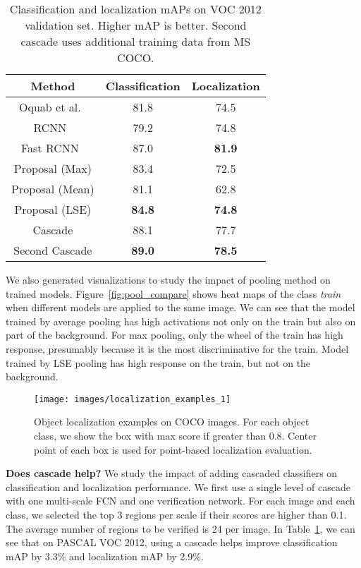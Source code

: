 \documentclass[10pt,twocolumn,letterpaper]{article}
\begin{document}
\begin{table}
\small
\center
\begin{tabular}{ccc}
\hline
Method & Classification & Localization\\
\hline
\rowcolor{gray!30}Oquab et al.~\cite{Oquab_2015_CVPR} & 81.8 & 74.5\\
RCNN~\cite{DBLP:journals/corr/GirshickDDM13} & 79.2 & 74.8\\
\rowcolor{gray!30}Fast RCNN~\cite{DBLP:journals/corr/Girshick15} & 87.0 & \textbf{81.9}\\
\hline
\hline
Proposal (Max) & 83.4 & 72.5\\
\rowcolor{gray!30}Proposal (Mean) & 81.1 & 62.8\\
Proposal (LSE) & \textbf{84.8} & \textbf{74.8}\\
\hline\hline
\rowcolor{gray!30}Cascade & 88.1 & 77.7\\
Second Cascade & \textbf{89.0} & \textbf{78.5}\\
\hline
\end{tabular}
\caption{Classification and localization mAPs on VOC 2012 validation set.  Higher mAP is better. Second cascade uses additional training data from MS COCO.}
\label{tab:voc12_val}
\end{table}


We also generated visualizations to study the impact of pooling method on trained models. Figure~\ref{fig:pool_compare} shows heat maps of the class \textit{train} when different models are applied to the same image. We can see that the model trained by average pooling has high activations not only on the train but also on part of the background. For max pooling, only the wheel of the train has high response, presumably because it is the most discriminative for the train. Model trained by LSE pooling has high response on the train, but not on the background.

\begin{figure*}[t]
  \centering
    \texttt{[image: images/localization\_examples\_1]}
  \caption{Object localization examples on COCO images. For each object class, we show the box with max score if greater than 0.8. Center point of each box is used for point-based localization evaluation.}
  \label{fig:loc_vis}
\end{figure*}

\textbf{Does cascade help?} We study the impact of adding cascaded classifiers on classification and localization performance. We first use a single level of cascade with one multi-scale FCN and one verification network. For each image and each class, we selected the top 3 regions per scale if their scores are higher than 0.1. The average number of regions to be verified is 24 per image. In Table~\ref{tab:voc12_val}, we can see that on PASCAL VOC 2012, using a cascade helps improve classification mAP by 3.3\% and localization mAP by 2.9\%.
\end{document}
